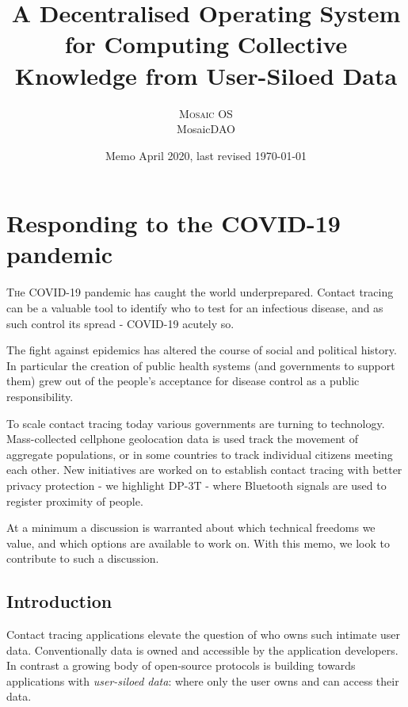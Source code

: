 \documentclass[twoside,twocolumn]{article}
\title{A Decentralised Operating System for Computing Collective Knowledge from User-Siloed Data} %
\author{%
\textsc{Mosaic OS} \\[1ex]
\normalsize MosaicDAO
}
\date{Memo April 2020, last revised \today} %
\begin{document}
\maketitle


\section{Responding to the COVID-19 pandemic}

\lettrine[nindent=0em,lines=3]{T} he COVID-19 pandemic has caught the world underprepared. Contact tracing can be a valuable tool to identify who to test for an infectious disease, and as such control its spread - COVID-19 acutely so.

The fight against epidemics has altered the course of social and political history. In particular the creation of public health systems (and governments to support them) grew out of the people's acceptance for disease control as a public responsibility.

To scale contact tracing today various governments are turning to technology. Mass-collected cellphone geolocation data is used track the movement of aggregate populations, or in some countries to track individual citizens meeting each other.
New initiatives are worked on to establish contact tracing with better privacy protection - we highlight DP-3T - where Bluetooth signals are used to register proximity of people.

At a minimum a discussion is warranted about which technical freedoms we value, and which options are available to work on. With this memo, we look to contribute to such a discussion.


\subsection{Introduction}
Contact tracing applications elevate the question of who owns such intimate user data. Conventionally data is owned and accessible by the application developers. In contrast a growing body of open-source protocols is building towards applications with \emph{user-siloed data}: where only the user owns and can access their data.
\end{document}
